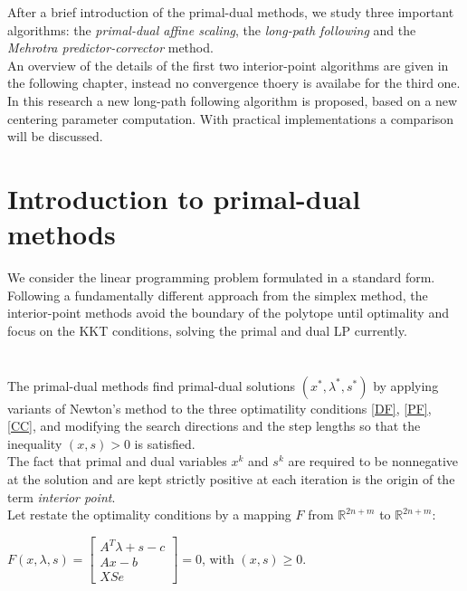\documentclass[a4paper,10 pt,titlepage,twoside]{book}
\theoremstyle{plain}
\theoremstyle{definition}
\theoremstyle{remark}
\begin{document}
After a brief introduction of the primal-dual methods, we study three important algorithms: the \textit{primal-dual affine scaling}, the \textit{long-path following} and the \textit{Mehrotra predictor-corrector} method.\\
An overview of the details of the first two interior-point algorithms are given in the following chapter, instead no convergence thoery is availabe for the third one. \\
In this research a new long-path following algorithm is proposed, based on a new centering parameter computation. With practical implementations a comparison will be discussed.

\newpage
\section{Introduction to primal-dual methods}
We consider the linear programming problem formulated in a standard form. \\
Following a fundamentally different approach from the simplex method, the interior-point methods avoid the boundary of the polytope until optimality and focus on the KKT conditions, solving the primal and dual LP currently.\\
\\
\\
The primal-dual methods find primal-dual solutions $(x^{*},\lambda^{*},s^{*})$ by applying variants of Newton's method to the three optimatility conditions \ref{DF}, \ref{PF}, \ref{CC}, and modifying the search directions and the step lengths so that the inequality $(x,s)>0$ is satisfied.\\
The fact that primal and dual variables $x^{k}$ and $s^{k}$ are required to be nonnegative at the solution and are kept strictly positive at each iteration is the origin of the term \textit{interior point}.\\
 Let restate the optimality conditions by a mapping $\mathit{F}$ from $\mathbb{R}^{2n+m}$ to $\mathbb{R}^{2n+m}$:
\begin{center}\label{F}
	$\mathit{F}(x,\lambda,s)= \begin{bmatrix}
	A^{T}\lambda+s-c \\Ax-b \\XSe
	\end{bmatrix}=0$, with $(x,s)\geq0.$
\end{center}
\end{document}
